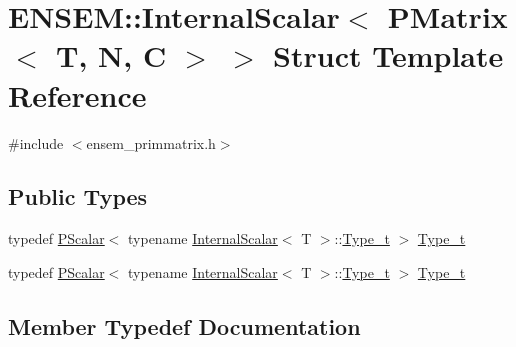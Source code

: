 \hypertarget{structENSEM_1_1InternalScalar_3_01PMatrix_3_01T_00_01N_00_01C_01_4_01_4}{}\section{E\+N\+S\+EM\+:\+:Internal\+Scalar$<$ P\+Matrix$<$ T, N, C $>$ $>$ Struct Template Reference}
\label{structENSEM_1_1InternalScalar_3_01PMatrix_3_01T_00_01N_00_01C_01_4_01_4}


{\ttfamily \#include $<$ensem\+\_\+primmatrix.\+h$>$}

\subsection*{Public Types}
\begin{DoxyCompactItemize}
\item 
typedef \mbox{\hyperlink{classENSEM_1_1PScalar}{P\+Scalar}}$<$ typename \mbox{\hyperlink{structENSEM_1_1InternalScalar}{Internal\+Scalar}}$<$ T $>$\+::\mbox{\hyperlink{structENSEM_1_1InternalScalar_3_01PMatrix_3_01T_00_01N_00_01C_01_4_01_4_a8f6d0ab798cf3ec250a72a2bc706c676}{Type\+\_\+t}} $>$ \mbox{\hyperlink{structENSEM_1_1InternalScalar_3_01PMatrix_3_01T_00_01N_00_01C_01_4_01_4_a8f6d0ab798cf3ec250a72a2bc706c676}{Type\+\_\+t}}
\item 
typedef \mbox{\hyperlink{classENSEM_1_1PScalar}{P\+Scalar}}$<$ typename \mbox{\hyperlink{structENSEM_1_1InternalScalar}{Internal\+Scalar}}$<$ T $>$\+::\mbox{\hyperlink{structENSEM_1_1InternalScalar_3_01PMatrix_3_01T_00_01N_00_01C_01_4_01_4_a8f6d0ab798cf3ec250a72a2bc706c676}{Type\+\_\+t}} $>$ \mbox{\hyperlink{structENSEM_1_1InternalScalar_3_01PMatrix_3_01T_00_01N_00_01C_01_4_01_4_a8f6d0ab798cf3ec250a72a2bc706c676}{Type\+\_\+t}}
\end{DoxyCompactItemize}


\subsection{Member Typedef Documentation}
\mbox{\label{structENSEM_1_1InternalScalar_3_01PMatrix_3_01T_00_01N_00_01C_01_4_01_4_a8f6d0ab798cf3ec250a72a2bc706c676}} 
